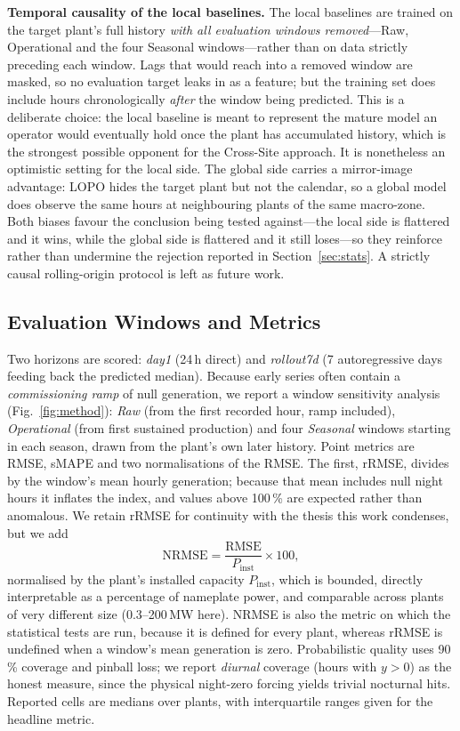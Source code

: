 \documentclass[conference]{IEEEtran}
\begin{document}
\textbf{Temporal causality of the local baselines.} The local baselines are trained on the
target plant's full history \emph{with all evaluation windows removed}---Raw, Operational and
the four Seasonal windows---rather than on data strictly preceding each window. Lags that
would reach into a removed window are masked, so no evaluation target leaks in as a feature;
but the training set does include hours chronologically \emph{after} the window being
predicted. This is a deliberate choice: the local baseline is meant to represent the mature
model an operator would eventually hold once the plant has accumulated history, which is the
strongest possible opponent for the Cross-Site approach. It is nonetheless an optimistic
setting for the local side. The global side carries a mirror-image advantage: LOPO hides the
target plant but not the calendar, so a global model does observe the same hours at
neighbouring plants of the same macro-zone. Both biases favour the conclusion being tested
against---the local side is flattered and it wins, while the global side is flattered and it
still loses---so they reinforce rather than undermine the rejection reported in
Section~\ref{sec:stats}. A strictly causal rolling-origin protocol is left as future work.

\subsection{Evaluation Windows and Metrics}
\label{sec:windows}
Two horizons are scored: \emph{day1} (24\,h direct) and \emph{rollout7d} (7 autoregressive
days feeding back the predicted median). Because early series often contain a
\emph{commissioning ramp} of null generation, we report a window sensitivity analysis
(Fig.~\ref{fig:method}): \emph{Raw} (from the first recorded hour, ramp included),
\emph{Operational} (from first sustained production) and four \emph{Seasonal} windows
starting in each season, drawn from the plant's own later history. Point metrics are RMSE,
sMAPE and two normalisations of the RMSE. The first, rRMSE, divides by the window's mean
hourly generation; because that mean includes null night hours it inflates the index, and
values above 100\,\% are expected rather than anomalous. We retain rRMSE for continuity with
the thesis this work condenses, but we add
\begin{equation}
\mathrm{NRMSE} = \frac{\mathrm{RMSE}}{P_{\mathrm{inst}}}\times 100,
\end{equation}
normalised by the plant's installed capacity $P_{\mathrm{inst}}$, which is bounded, directly
interpretable as a percentage of nameplate power, and comparable across plants of very
different size (0.3--200\,MW here). NRMSE is also the metric on which the statistical tests
are run, because it is defined for every plant, whereas rRMSE is undefined when a window's
mean generation is zero. Probabilistic quality uses 90\,\% coverage and pinball loss; we
report \emph{diurnal} coverage (hours with $y>0$) as the honest measure, since the physical
night-zero forcing yields trivial nocturnal hits. Reported cells are medians over plants,
with interquartile ranges given for the headline metric.
\end{document}
